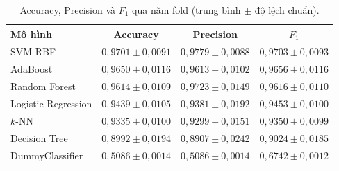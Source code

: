 \documentclass[12pt,a4paper,oneside]{report}
\begin{document}
\begin{table}[H]
    \centering
    \small
    \caption{Accuracy, Precision và $F_1$ qua năm fold
    (trung bình $\pm$ độ lệch chuẩn).}
    \label{tab:cv_accuracy_precision_f1}
    \begin{tabular}{lccc}
        \toprule
        \textbf{Mô hình}
        & \textbf{Accuracy}
        & \textbf{Precision}
        & \textbf{$F_1$} \\
        \midrule
        SVM RBF
        & $0{,}9701 \pm 0{,}0091$
        & $0{,}9779 \pm 0{,}0088$
        & $0{,}9703 \pm 0{,}0093$ \\

        AdaBoost
        & $0{,}9650 \pm 0{,}0116$
        & $0{,}9613 \pm 0{,}0102$
        & $0{,}9656 \pm 0{,}0116$ \\

        Random Forest
        & $0{,}9614 \pm 0{,}0109$
        & $0{,}9723 \pm 0{,}0149$
        & $0{,}9616 \pm 0{,}0110$ \\

        Logistic Regression
        & $0{,}9439 \pm 0{,}0105$
        & $0{,}9381 \pm 0{,}0192$
        & $0{,}9453 \pm 0{,}0100$ \\

        $k$-NN
        & $0{,}9335 \pm 0{,}0100$
        & $0{,}9299 \pm 0{,}0151$
        & $0{,}9350 \pm 0{,}0099$ \\

        Decision Tree
        & $0{,}8992 \pm 0{,}0194$
        & $0{,}8907 \pm 0{,}0242$
        & $0{,}9024 \pm 0{,}0185$ \\

        DummyClassifier
        & $0{,}5086 \pm 0{,}0014$
        & $0{,}5086 \pm 0{,}0014$
        & $0{,}6742 \pm 0{,}0012$ \\
        \bottomrule
    \end{tabular}
\end{table}
\end{document}
